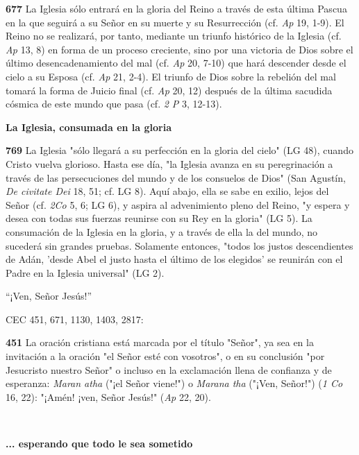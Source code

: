 \documentclass[]{article}
\begin{document}
\textbf{677} La Iglesia sólo entrará en la gloria del Reino a través de esta última Pascua en la que seguirá a su Señor en su muerte y su Resurrección (cf. \emph{Ap} 19, 1-9). El Reino no se realizará, por tanto, mediante un triunfo histórico de la Iglesia (cf. \emph{Ap} 13, 8) en forma de un proceso creciente, sino por una victoria de Dios sobre el último desencadenamiento del mal (cf. \emph{Ap} 20, 7-10) que hará descender desde el cielo a su Esposa (cf. \emph{Ap} 21, 2-4). El triunfo de Dios sobre la rebelión del mal tomará la forma de Juicio final (cf. \emph{Ap} 20, 12) después de la última sacudida cósmica de este mundo que pasa (cf. \emph{2 P} 3, 12-13).

\textbf{La Iglesia, consumada en la gloria}

\textbf{769} La Iglesia "sólo llegará a su perfección en la gloria del cielo" (LG 48), cuando Cristo vuelva glorioso. Hasta ese día, "la Iglesia avanza en su peregrinación a través de las persecuciones del mundo y de los consuelos de Dios" (San Agustín, \emph{De civitate Dei} 18, 51; cf. LG 8). Aquí abajo, ella se sabe en exilio, lejos del Señor (cf. \emph{2Co} 5, 6; LG 6), y aspira al advenimiento pleno del Reino, "y espera y desea con todas sus fuerzas reunirse con su Rey en la gloria" (LG 5). La consumación de la Iglesia en la gloria, y a través de ella la del mundo, no sucederá sin grandes pruebas. Solamente entonces, "todos los justos descendientes de Adán, 'desde Abel el justo hasta el último de los elegidos' se reunirán con el Padre en la Iglesia universal" (LG 2).

``¡Ven, Señor Jesús!''

CEC 451, 671, 1130, 1403, 2817:

\textbf{451} La oración cristiana está marcada por el título "Señor", ya sea en la invitación a la oración "el Señor esté con vosotros", o en su conclusión "por Jesucristo nuestro Señor" o incluso en la exclamación llena de confianza y de esperanza: \emph{Maran atha} ("¡el Señor viene!") o \emph{Marana tha} ("¡Ven, Señor!") (\emph{1 Co} 16, 22): "¡Amén! ¡ven, Señor Jesús!" (\emph{Ap} 22, 20).

\textbf{\\ }

\textbf{... esperando que todo le sea sometido}
\end{document}
